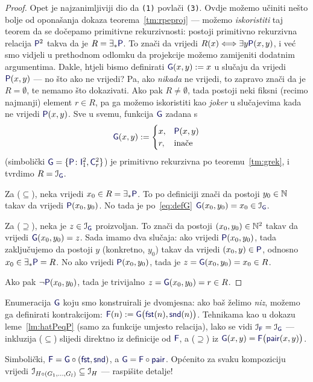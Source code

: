 \begin{proof}
Opet je najzanimljiviji dio da \texttt{(1)} povlači \texttt{(3)}. %
Ovdje možemo učiniti nešto bolje od oponašanja dokaza teorema~\ref{tm:rpeproj} --- možemo \emph{iskoristiti} taj teorem da se dočepamo primitivne rekurzivnosti: postoji primitivno rekurzivna relacija $\f P^2$ takva da je $R=\exists_*\f P$. To znači da vrijedi $R(x)\Longleftrightarrow\exists y\f P(x,y)$, i već smo vidjeli u prethodnom odlomku da projekcije možemo zamijeniti dodatnim argumentima. Dakle, htjeli bismo definirati $\f G(x,y):=x$ u slučaju da vrijedi $\f P(x,y)$ --- no što ako ne vrijedi? Pa, ako \emph{nikada} ne vrijedi, to zapravo znači da je $R=\emptyset$, te nemamo što dokazivati. Ako pak $R\not=\emptyset$, tada postoji neki fiksni (recimo najmanji) element $r\in R$, pa ga možemo iskoristiti kao \emph{joker} u slučajevima kada ne vrijedi $\f P(x,y)$. Sve u svemu, funkcija $\f G$ zadana s
\begin{equation}\label{eq:defG}
    \f G(x,y):=\begin{cases}
        x,&\f P(x,y)\\
        r,&\text{inače}
    \end{cases}
\end{equation}
(simbolički $\f G=\{\f P\colon\f I_1^2,\f C_r^2\}$) je primitivno rekurzivna po teoremu~\ref{tm:grek}, i tvrdimo $R=\im{\f G}$.

Za ($\subseteq$), neka vrijedi $x_0\in R=\exists_*\f P$. To po definiciji znači da postoji $y_0\in{\mathbb N}$ takav da vrijedi $\f P(x_0,y_0)$. No tada je po~\eqref{eq:defG} $\f G(x_0,y_0)=x_0\in\im{\f G}$.

Za ($\supseteq$), neka je $z\in\im{\f G}$ proizvoljan. To znači da postoji $(x_0,y_0)\in{\mathbb N}^2$ takav da vrijedi $\f G(x_0,y_0)=z$. Sada imamo dva slučaja: ako vrijedi $\f P(x_0,y_0)$, tada zaključujemo da postoji $y$ (konkretno, $y_0$) takav da vrijedi $(x_0,y)\in\f P$, odnosno $x_0\in\exists_*\f P=R$. No ako vrijedi $\f P(x_0,y_0)$, tada je $z=\f G(x_0,y_0)=x_0\in R$.

Ako pak $\lnot\f P(x_0,y_0)$, tada je trivijalno $z=\f G(x_0,y_0)=r\in R$.
\end{proof}

\begin{napomena}[{name=[enumeracija kao jednomjesna funkcija --- niz]}]
Enumeracija $\f G$ koju smo konstruirali je dvomjesna: ako baš želimo \emph{niz}, možemo ga definirati kontrakcijom: $\f F(n):=\f G\bigl(\f{fst}(n),\f{snd}(n)\bigr)$. Tehnikama kao u dokazu leme~\ref{lm:hatPeqP} (samo za funkcije umjesto relacija), lako se vidi $\im{\f F}=\im{\f G}$ --- inkluzija ($\subseteq$) slijedi direktno iz definicije od $\f F$, a ($\supseteq$) iz $\f G(x,y)=\f F\bigl(\f{pair}(x,y)\bigr)$.

Simbolički, $\f F=\f G\circ(\f{fst},\f{snd})$, a $\f G=\f F\circ\f{pair}$. Općenito za svaku kompoziciju vrijedi $\mathcal I_{H\circ(G_1,\dotsc,G_l)}\subseteq\mathcal I_{H}$ --- raspišite detalje!
\end{napomena}

